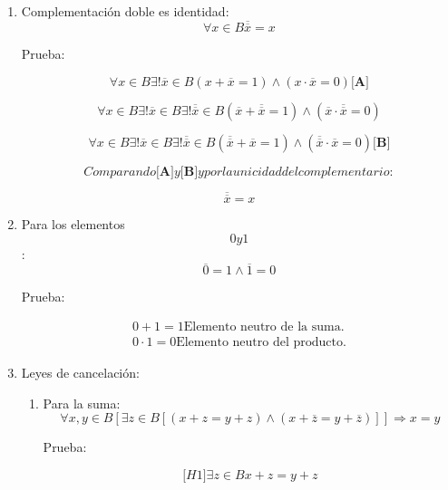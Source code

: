 \documentclass[
]{article}
\begin{document}
\begin{enumerate}
\begin{enumerate}
\begin{enumerate}
      \[\mathit{luego}{a \neq \overline{a}}\]
    \item
      Complementación doble es identidad:
      \[\forall{x \in B}{\overline{\overline{x}} = x}\]

      Prueba:

      \[\forall{x \in B}\exists\mathtt{\mathrm{!}}{\overline{x} \in B}{\left( {{x + \overline{x}} = 1} \right) \land \left( {{x \cdot \overline{x}} = 0} \right)}{\lbrack\mathbf{A}\rbrack}\]

      \[\forall{x \in B}{\exists\mathtt{\mathrm{!}}}{\overline{x} \in B}{\exists\mathtt{\mathrm{!}}}{\overline{\overline{x}} \in B}{\left( {{\overline{x} + \overline{\overline{x}}} = 1} \right) \land \left( {{\overline{x} \cdot \overline{\overline{x}}} = 0} \right)}\]

      \[\forall{x \in B}{\exists\mathtt{\mathrm{!}}}{\overline{x} \in B}{\exists\mathtt{\mathrm{!}}}{\overline{\overline{x}} \in B}{\left( {{\overline{\overline{x}} + \overline{x}} = 1} \right) \land \left( {{\overline{\overline{x}} \cdot \overline{x}} = 0} \right)}{\lbrack\mathbf{B}\rbrack}\]

      \[\mathit{Comparando}{\lbrack\mathbf{A}\rbrack}y{\lbrack\mathbf{B}\rbrack}y\mathit{por}\mathit{la}\mathit{unicidad}\mathit{del}\mathit{complementario}:\]

      \[\overline{\overline{x}} = x\]
    \item
      Para los elementos \[0y1\]:
      \[{\overline{0} = 1} \land {\overline{1} = 0}\]

      Prueba:

      \[\begin{matrix}
      {{{0 + 1} = 1}\text{Elemento neutro de la suma.}} \\
      {0{\cdot}1{= 0}\text{Elemento neutro del producto.}}
      \end{matrix}\]
    \item
      Leyes de cancelación:

      \begin{enumerate}
      \def\labelenumiv{\arabic{enumiv}.}
      \item
        Para la
        suma:\[\forall x,{y \in B}\left\lbrack {\exists{z \in B}\left\lbrack {\left( {{x + z} = {y + z}} \right) \land \left( {{x + \overline{z}} = {y + \overline{z}}} \right)} \right\rbrack} \right\rbrack\Rightarrow{x = y}\]

        Prueba:

        \[{\lbrack\mathit{H1}\rbrack}\exists{z \in B}{{x + z} = {y + z}}\]


\end{enumerate}
\end{enumerate}
\end{enumerate}
\end{enumerate}
\end{document}
